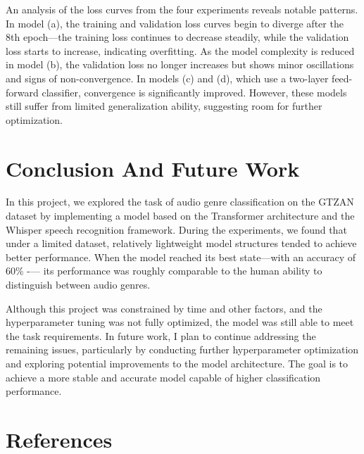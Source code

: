 \documentclass{article}
\begin{document}
    An analysis of the loss curves from the four experiments reveals notable patterns. In model (a), the training and validation loss curves begin to diverge after the 8th epoch—the training loss continues to decrease steadily, while the validation loss starts to increase, indicating overfitting. As the model complexity is reduced in model (b), the validation loss no longer increases but shows minor oscillations and signs of non-convergence. In models (c) and (d), which use a two-layer feed-forward classifier, convergence is significantly improved. However, these models still suffer from limited generalization ability, suggesting room for further optimization.


  \section{Conclusion And Future Work}

    In this project, we explored the task of audio genre classification on the GTZAN dataset by implementing a model based on the Transformer architecture and the Whisper speech recognition framework. During the experiments, we found that under a limited dataset, relatively lightweight model structures tended to achieve better performance. When the model reached its best state—with an accuracy of 60\% -— its performance was roughly comparable to the human ability to distinguish between audio genres.

    Although this project was constrained by time and other factors, and the hyperparameter tuning was not fully optimized, the model was still able to meet the task requirements. In future work, I plan to continue addressing the remaining issues, particularly by conducting further hyperparameter optimization and exploring potential improvements to the model architecture. The goal is to achieve a more stable and accurate model capable of higher classification performance.


  \section*{References}
\end{document}
